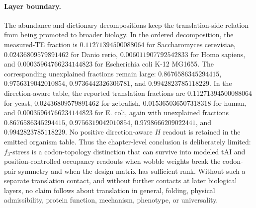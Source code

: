\paragraph{Layer boundary.}
The abundance and dictionary decompositions keep the translation-side relation from being promoted to broader biology.  In the ordered decomposition, the measured-TE fraction is $0.11271394500088064$ for Saccharomyces cerevisiae, $0.02436809579891462$ for Danio rerio, $0.006011907792542833$ for Homo sapiens, and $0.00035964766234144823$ for Escherichia coli K-12 MG1655.  The corresponding unexplained fractions remain large: $0.8676586345294415$, $0.9756319042010854$, $0.9736442326306781$, and $0.9942823785118229$.  In the direction-aware table, the reported translation fractions are $0.11271394500088064$ for yeast, $0.02436809579891462$ for zebrafish, $0.015365036507318318$ for human, and $0.00035964766234144823$ for E. coli, again with unexplained fractions $0.8676586345294415$, $0.9756319042010854$, $0.9798666209022441$, and $0.9942823785118229$.  No positive direction-aware $H$ readout is retained in the emitted organism table.  Thus the chapter-level conclusion is deliberately limited: $f_3$-stress is a codon-topology distinction that can survive into modeled tAI and position-controlled occupancy readouts when wobble weights break the codon-pair symmetry and when the design matrix has sufficient rank.  Without such a separate translation contact, and without further contacts at later biological layers, no claim follows about translation in general, folding, physical admissibility, protein function, mechanism, phenotype, or universality.

